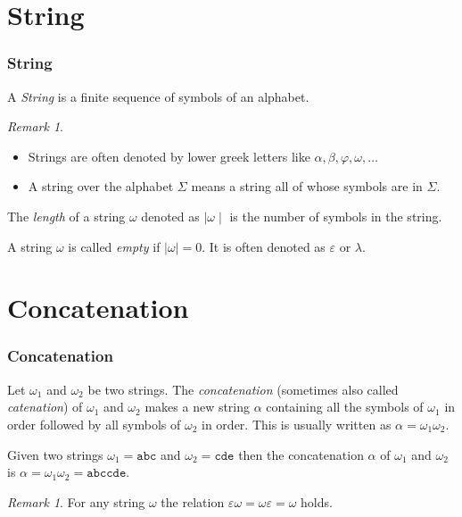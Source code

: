 \documentclass{beamer}
\theoremstyle{remark}
\newtheorem{remark}[theorem]{Remark}
\newcommand{\emptystring}{\varepsilon}
\newcommand{\length}[1]{\mid #1 \mid}
\begin{document}
\section{String}
\begin{frame}
	\frametitle{String}
	\begin{definition}
		A {\em String} is a finite sequence of symbols of an alphabet.
	\end{definition}
	
	\pause
	
	\begin{remark}
		\begin{itemize}
			\item Strings are often denoted by lower greek letters like $\alpha, \beta, \varphi, \omega, \ldots$
			\item A string over the alphabet $\Sigma$ means a string all of whose symbols are in $\Sigma$.
		\end{itemize}
	\end{remark}
	
	\pause
	
	\begin{definition}
		The {\em length} of a string $\omega$ denoted as $\length{\omega}$ is the number of symbols
		in the string.
	\end{definition}
	
	\pause
	
	\begin{definition}
		A string  $\omega$ is called {\em empty} if $\length{\omega} = 0$. It is often denoted as $\emptystring$ or $\lambda$.
	\end{definition}
	
\end{frame}

\section{Concatenation}
\begin{frame}
	\frametitle{Concatenation}
	\begin{definition}
		Let $\omega_1$ and $\omega_2$ be two strings. The {\em concatenation} (sometimes also called {\em catenation})
		of $\omega_1$ and $\omega_2$ makes a new string $\alpha$ containing all the symbols of
		$\omega_1$ in order followed by all symbols of $\omega_2$ in order. This is usually written as
		$\alpha = \omega_1 \omega_2$.
	\end{definition}
	
	\pause
	
	\begin{example}
		Given two strings $\omega_1 = \mathtt{abc}$ and $\omega_2 = \mathtt{cde}$ then the concatenation $\alpha$ of
		$\omega_1$ and $\omega_2$ is
		$\alpha = \omega_1 \omega_2 = \mathtt{abc}\mathtt{cde}$.
	\end{example}
	
	\pause
	
	\begin{remark}
		For any string $\omega$ the relation $\emptystring \omega = \omega \emptystring = \omega$ holds.
	\end{remark}

\end{frame}
\end{document}
